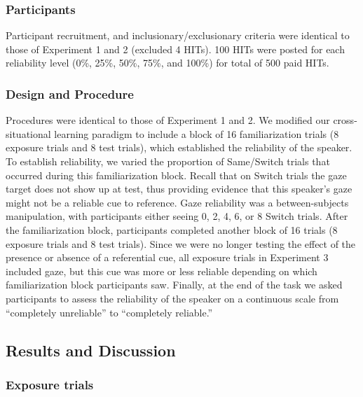 \documentclass[authoryear, review]{elsarticle}
\begin{document}
\subsubsection{Participants}\label{participants-2}

Participant recruitment, and inclusionary/exclusionary criteria were
identical to those of Experiment 1 and 2 (excluded 4 HITs). 100 HITs
were posted for each reliability level (0\%, 25\%, 50\%, 75\%, and
100\%) for total of 500 paid HITs.

\subsubsection{Design and Procedure}\label{design-and-procedure-2}

Procedures were identical to those of Experiment 1 and 2. We modified
our cross-situational learning paradigm to include a block of 16
familiarization trials (8 exposure trials and 8 test trials), which
established the reliability of the speaker. To establish reliability, we
varied the proportion of Same/Switch trials that occurred during this
familiarization block. Recall that on Switch trials the gaze target does
not show up at test, thus providing evidence that this speaker's gaze
might not be a reliable cue to reference. Gaze reliability was a
between-subjects manipulation, with participants either seeing 0, 2, 4,
6, or 8 Switch trials. After the familiarization block, participants
completed another block of 16 trials (8 exposure trials and 8 test
trials). Since we were no longer testing the effect of the presence or
absence of a referential cue, all exposure trials in Experiment 3
included gaze, but this cue was more or less reliable depending on which
familiarization block participants saw. Finally, at the end of the task
we asked participants to assess the reliability of the speaker on a
continuous scale from ``completely unreliable'' to ``completely
reliable.''

\subsection{Results and Discussion}\label{results-and-discussion-2}

\subsubsection{Exposure trials}\label{exposure-trials-2}
\end{document}
